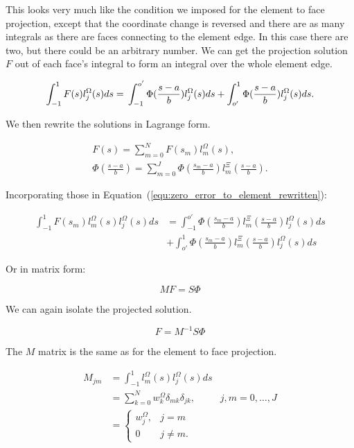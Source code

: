 \noindent
This looks very much like the condition we imposed for the element to face projection, except that
the coordinate change is reversed and there are as many integrals as there are faces connecting to
the element edge. In this case there are two, but there could be an arbitrary number. We can get the
projection solution \(F\) out of each face's integral to form an integral over the whole element
edge.

\begin{equation} \label{equ:zero_error_to_element_rewritten}
	\int_{-1}^{1}F(s)l_j^\Omega(s)ds = \\
	\int_{-1}^{o'} \Phi (\frac{s -a}{b}) l_j^\Omega(s)ds + 
	\int_{o'}^{1} \Phi(\frac{s-a}{b})l_j^\Omega(s)ds.
\end{equation}

\noindent
We then rewrite the solutions in Lagrange form.

\begin{gather}
	F(s) = \sum_{m = 0}^{N}F(s_m)l_m^\Omega(s), \\
	\Phi(\frac{s -a}{b}) = \sum_{m = 0}^{J}\Phi(\frac{s_m -a}{b})l_m^\Xi(\frac{s -a}{b}).
\end{gather}

\noindent
Incorporating those in Equation~(\ref{equ:zero_error_to_element_rewritten}):

\begin{equation} 
	\begin{aligned}
		\int_{-1}^{1}F(s_m)l_m^\Omega(s) l_j^\Omega(s)ds &= \int_{-1}^{o'} \Phi(\frac{s_m -a}{b})l_m^\Xi(\frac{s -a}{b}) l_j^\Omega(s)ds \\
		&+ \int_{o'}^{1} \Phi(\frac{s_m -a}{b})l_m^\Xi(\frac{s -a}{b}) l_j^\Omega(s)ds
	\end{aligned}
\end{equation}

\noindent
Or in matrix form:

\begin{equation} 
	MF = S \Phi
\end{equation}

\noindent
We can again isolate the projected solution.

\begin{equation} 
	F = M^{-1} S \Phi
\end{equation}

\noindent
The \(M\) matrix is the same as for the element to face projection.

\begin{equation} \label{equ:matrix_M_face_to_element}
	\begin{aligned}
		M_{jm} &= \int_{-1}^{1}l_m^{\Omega}(s)l_j^{\Omega}(s)ds \\
		&= \sum_{k = 0}^{N} w_k ^{\Omega} \delta_{mk}\delta_{jk}, & j, m = 0, \ldots, J \\
		&= \left \{ \begin{matrix}
			w_j^{\Omega }, & j = m \\ 
			0 & j \neq m.
			\end{matrix}\right.
	\end{aligned}
\end{equation}

